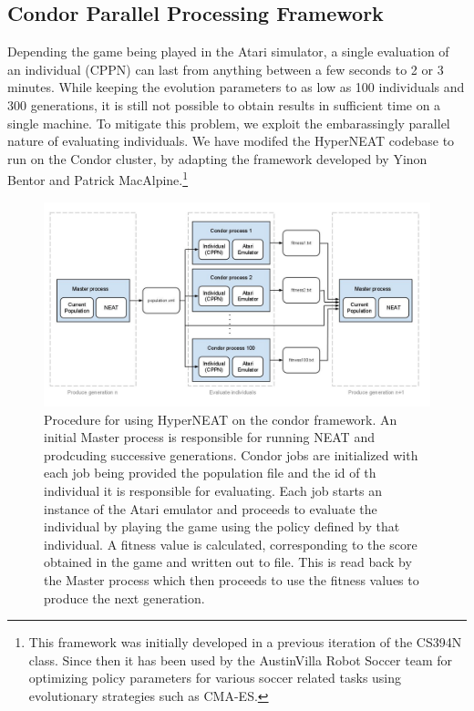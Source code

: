 \documentclass{article}
\begin{document}
\subsection{Condor Parallel Processing Framework}
\label{sec:condor}
Depending the game being played in the Atari simulator, a single evaluation of an individual (CPPN) can last from anything between a few seconds to 2 or 3 minutes. While keeping the evolution parameters to as low as 100 individuals and 300 generations, it is still not possible to obtain results in sufficient time on a single machine. To mitigate this problem, we exploit the embarassingly parallel nature of evaluating individuals. We have modifed the HyperNEAT codebase to run on the Condor cluster, by adapting the framework developed by Yinon Bentor and Patrick MacAlpine.\footnote{This framework was initially developed in a previous iteration of the CS394N class. Since then it has been used by the AustinVilla Robot Soccer team for optimizing policy parameters for various soccer related tasks using evolutionary strategies such as CMA-ES.}

\begin{figure}[ht]
\begin{center}
\includegraphics[scale=.35]{figures/CondorHyperNEAT.jpg}
\end{center}
\caption{Procedure for using HyperNEAT on the condor framework. An initial Master process is responsible for running NEAT and prodcuding successive generations. Condor jobs are initialized with each job being provided the population file and the id of th individual it is responsible for evaluating. Each job starts an instance of the Atari emulator and proceeds to evaluate the individual by playing the game using the policy defined by that individual. A fitness value is calculated, corresponding to the score obtained in the game and written out to file. This is read back by the Master process which then proceeds to use the fitness values to produce the next generation.}
\label{fig:condor}
\end{figure}
\end{document}
